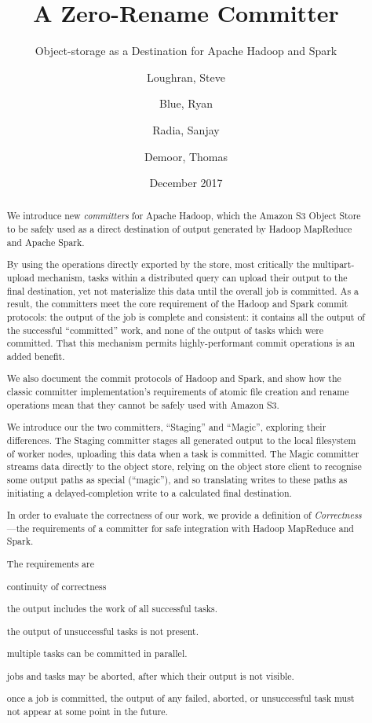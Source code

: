 \documentclass[format=acmsmall, screen=true, review=false]{acmart}
\title{ A Zero-Rename Committer}
\subtitle{Object-storage as a Destination for Apache Hadoop and Spark}
\author{
  Loughran, Steve
\and
  Blue, Ryan
\and
  Radia, Sanjay
\and
  Demoor, Thomas
}
\date{December 2017}
\begin{document}
\maketitle


\begin{abstract}

We introduce new \emph{committers} for Apache Hadoop, which
the Amazon S3 Object Store to be safely used as a direct destination of output generated
by Hadoop MapReduce and Apache Spark.

By using the operations directly exported by the store,
most critically the multipart-upload mechanism, tasks within a distributed
query can upload their output to the final destination,
yet not materialize this data until the overall job is committed.
As a result, the committers meet the core requirement of the Hadoop and Spark commit
protocols: the output of the job is complete and consistent: it contains
all the output of the successful ``committed'' work, and none of the output of
tasks which were committed.
That this mechanism permits highly-performant commit operations is an added benefit.

We also document the commit protocols of Hadoop and Spark, and show how the classic committer
implementation's requirements of atomic file creation and rename operations mean that they
cannot be safely used with Amazon S3.

We introduce our the two committers, ``Staging'' and ``Magic'', exploring their differences.
The Staging committer stages all generated output to the local filesystem of
worker nodes, uploading this data when a task is committed.
The Magic committer streams data directly to the object store, relying on the
object store client to recognise some output paths as special (``magic''), and
so translating writes to these paths as initiating a delayed-completion write
to a calculated final destination.

In order to evaluate the correctness of our work, we provide a definition
of \emph{Correctness} ---the requirements of a committer for safe integration
with Hadoop MapReduce and Spark.

The requirements are

\begin{labeling}{continuity of correctness}
  \item [complete]    the output includes the work of all successful tasks.
  \item [exclusive]   the output of unsuccessful tasks is not present.
  \item [concurrent]  multiple tasks can be committed in parallel.
  \item [abortable]   jobs and tasks may be aborted, after which their output is not visible.
  \item [continuity of correctness] once a job is committed, the output
  of any failed, aborted, or unsuccessful task must not appear at some point in the future.
\end{labeling}




\end{abstract}
\end{document}
